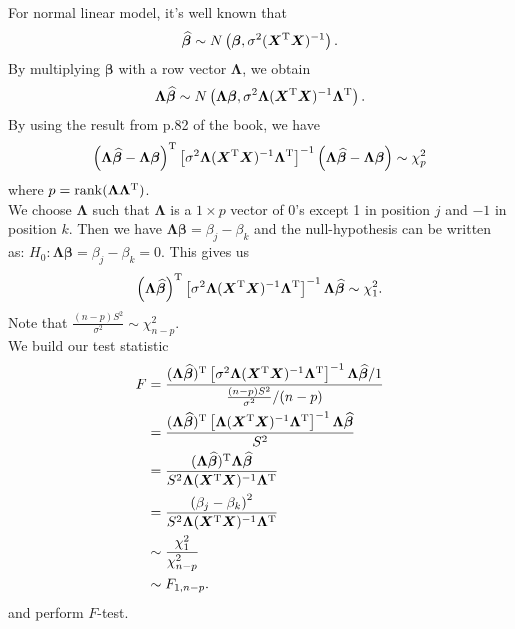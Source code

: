 \documentclass[a4paper]{article}
\begin{document}
For normal linear model, it's well known that
\begin{align*}
\widehat{\bm{\beta}} \sim N\left(\bm{\beta}, \sigma^2 (\bm{X}^{\rm T}\bm{X})^{-1} \right).
\end{align*}
By multiplying $\bm{\beta}$ with a row vector $\bm{\Lambda}$, we obtain
\begin{align*}
\bm{\Lambda}\widehat{\bm{\beta}} \sim N\left(\bm{\Lambda}\bm{\beta}, \sigma^2 \bm{\Lambda}(\bm{X}^{\rm T}\bm{X})^{-1}\bm{\Lambda}^{\rm T} \right).
\end{align*}
By using the result from p.82 of the book, we have
\begin{align*}
\left(\bm{\Lambda}{\widehat{\bm{\beta}}} - \bm{\Lambda}\bm{\beta}\right)^{\rm T}\left[\sigma^2\bm{\Lambda} (\bm{X}^{\rm T}\bm{X})^{-1} \bm{\Lambda}^{\rm T} \right]^{-1}\left(\bm{\Lambda}{\widehat{\bm{\beta}}} - \bm{\Lambda}\bm{\beta}\right) \sim \chi_{p}^2
\end{align*}
where $p = \mathrm{rank}(\bm{\Lambda}\bm{\Lambda}^{\rm T})$.\\

We choose $\bm{\Lambda}$ such that $\bm{\Lambda}$ is a $1 \times p$ vector of 0's except 1 in position $j$ and $-1$ in position $k$. Then we have $\bm{\Lambda}\bm{\beta} = \beta_{j} - \beta_{k}$ and the null-hypothesis can be written as: $H_{0}: \bm{\Lambda}\bm{\beta} = \beta_{j} - \beta_{k} = 0$. This gives us
\begin{align*}
\left(\bm{\Lambda}{\widehat{\bm{\beta}}}\right)^{\rm T}\left[\sigma^2\bm{\Lambda} (\bm{X}^{\rm T}\bm{X})^{-1} \bm{\Lambda}^{\rm T} \right]^{-1}\bm{\Lambda}{\widehat{\bm{\beta}}} \sim \chi_{1}^2.
\end{align*}
Note that $\frac{(n-p)S^2}{\sigma^2} \sim \chi_{n-p}^2$.\\

We build our test statistic
\begin{align*}
F &= \frac{(\bm{\Lambda}{\widehat{\bm{\beta}}})^{\rm T}\left[\sigma^2\bm{\Lambda} (\bm{X}^{\rm T}\bm{X})^{-1} \bm{\Lambda}^{\rm T} \right]^{-1}\bm{\Lambda}{\widehat{\bm{\beta}}}/1}{\frac{(n-p)S^2}{\sigma^2}/(n-p)}\\
&= \frac{(\bm{\Lambda}{\widehat{\bm{\beta}}})^{\rm T}\left[\bm{\Lambda} (\bm{X}^{\rm T}\bm{X})^{-1} \bm{\Lambda}^{\rm T} \right]^{-1}\bm{\Lambda}{\widehat{\bm{\beta}}}}{S^2}\\
&= \frac{(\bm{\Lambda}{\widehat{\bm{\beta}}})^{\rm T}\bm{\Lambda}{\widehat{\bm{\beta}}}}{S^2 \bm{\Lambda} (\bm{X}^{\rm T}\bm{X})^{-1} \bm{\Lambda}^{\rm T}}\\
&= \frac{\left(\beta_{j} - \beta_{k} \right)^2}{S^2 \bm{\Lambda} (\bm{X}^{\rm T}\bm{X})^{-1} \bm{\Lambda}^{\rm T}}\\
&\sim \frac{\chi_{1}^2}{\chi_{n-p}^2}\\
&\sim F_{1,n-p}.
\end{align*}
and perform $F$-test.
\end{document}

